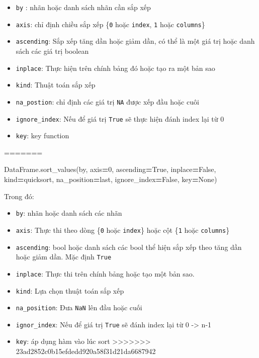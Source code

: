 \documentclass[
]{book}
\newenvironment{Shaded}{\begin{snugshade}}{\end{snugshade}}
\newcommand{\DecValTok}[1]{\textcolor[rgb]{0.00,0.00,0.81}{#1}}
\newcommand{\NormalTok}[1]{#1}
\newcommand{\OperatorTok}[1]{\textcolor[rgb]{0.81,0.36,0.00}{\textbf{#1}}}
\newcommand{\StringTok}[1]{\textcolor[rgb]{0.31,0.60,0.02}{#1}}
\newcommand{\VariableTok}[1]{\textcolor[rgb]{0.00,0.00,0.00}{#1}}
\begin{document}
\begin{itemize}
\item
  \texttt{by} : nhãn hoặc danh sách nhãn cần sắp xếp
\item
  \texttt{axis}: chỉ định chiều sắp xếp \{\texttt{0} hoặc \texttt{index}, \texttt{1} hoặc \texttt{columns}\}
\item
  \texttt{ascending}: Sắp xếp tăng dần hoặc giảm dần, có thể là một giá trị hoặc danh sách các giá trị boolean
\item
  \texttt{inplace}: Thực hiện trên chính bảng đó hoặc tạo ra một bản sao
\item
  \texttt{kind}: Thuật toán sắp xếp
\item
  \texttt{na\_postion}: chỉ định các giá trị \texttt{NA} được xếp đầu hoặc cuôi
\item
  \texttt{ignore\_index}: Nếu để giá trị \texttt{True} sẽ thực hiện đánh index lại từ 0
\item
  \texttt{key}: key function
\end{itemize}

=======

\begin{Shaded}
\begin{Highlighting}[]
\NormalTok{DataFrame.sort\_values(by, axis}\OperatorTok{=}\DecValTok{0}\NormalTok{, ascending}\OperatorTok{=}\VariableTok{True}\NormalTok{, inplace}\OperatorTok{=}\VariableTok{False}\NormalTok{, kind}\OperatorTok{=}\StringTok{\textquotesingle{}quicksort\textquotesingle{}}\NormalTok{, na\_position}\OperatorTok{=}\StringTok{\textquotesingle{}last\textquotesingle{}}\NormalTok{, ignore\_index}\OperatorTok{=}\VariableTok{False}\NormalTok{, key}\OperatorTok{=}\VariableTok{None}\NormalTok{)}
\end{Highlighting}
\end{Shaded}

Trong đó:

\begin{itemize}
\item
  \texttt{by}: nhãn hoặc danh sách các nhãn
\item
  \texttt{axis}: Thực thi theo dòng \{\texttt{0} hoặc \texttt{index}\} hoặc cột \{\texttt{1} hoặc \texttt{columns}\}
\item
  \texttt{ascending}: bool hoặc danh sách các bool thể hiện sắp xếp theo tăng dần hoặc giảm dần. Mặc định \texttt{True}
\item
  \texttt{inplace}: Thực thi trên chính bảng hoặc tạo một bản sao.
\item
  \texttt{kind}: Lựa chọn thuật toán sắp xếp
\item
  \texttt{na\_position}: Đưa \texttt{NaN} lên đầu hoặc cuối
\item
  \texttt{ignor\_index}: Nếu để giá trị \texttt{True} sẽ đánh index lại từ 0 -\textgreater{} n-1
\item
  \texttt{key}: áp dụng hàm vào lúc sort
  \textgreater\textgreater\textgreater\textgreater\textgreater\textgreater\textgreater{} 23ad2852c0b15efdedd920a58f31d21da6687942
\end{itemize}
\end{document}
